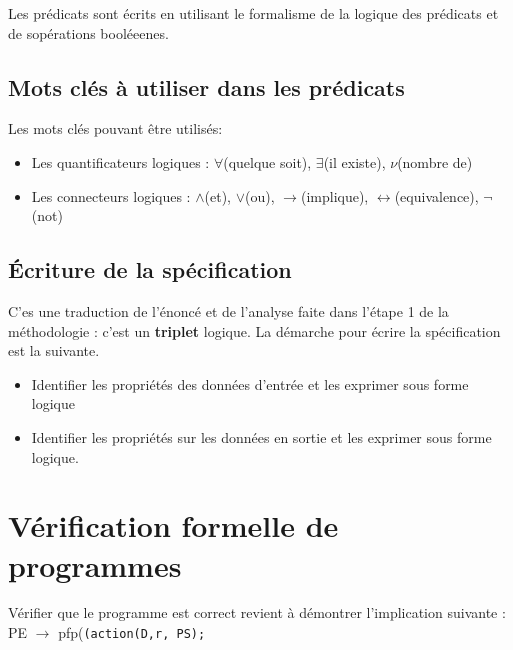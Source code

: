 \documentclass[12pt,a4paper,openany]{book}
\begin{document}
		Les prédicats sont écrits en utilisant le formalisme de la logique des prédicats et de sopérations booléeenes.
		\section{Mots clés à utiliser dans les prédicats}
		Les mots clés pouvant être utilisés: 
		\begin{itemize}
			\item Les quantificateurs logiques : $\forall$(quelque soit), $\exists$(il existe), $\nu$(nombre de)
			\item Les connecteurs logiques : $\wedge$(et), $\vee$(ou), $\rightarrow$(implique), $\leftrightarrow$(equivalence), $\lnot$(not)
		\end{itemize}
		\section{\'Ecriture de la spécification}
		C'es une traduction de l'énoncé et de l'analyse faite dans l'étape 1 de la méthodologie : c'est un \textbf{triplet} logique.
		La démarche pour écrire la spécification est la suivante.
			\begin{itemize}
				\item Identifier les propriétés des données d'entrée et les exprimer sous forme logique
				\item Identifier les propriétés sur les données en sortie et les exprimer sous forme logique. 
			\end{itemize}
	
	\chapter{Vérification formelle de programmes}
	Vérifier que le programme est correct revient à démontrer l'implication suivante :\\ PE $\rightarrow$ pfp(\texttt{(action(D,r, PS);}
\end{document}
